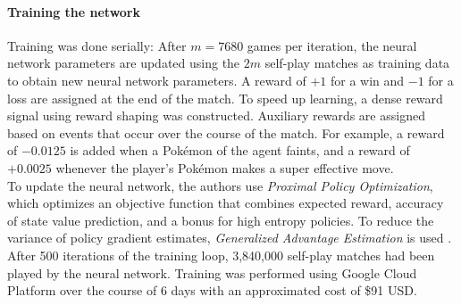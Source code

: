 \paragraph{Training the network}
Training was done serially: After $m = 7680$ games per iteration, the neural network parameters are updated
using the $2m$ self-play matches as training data to obtain new neural network parameters. A reward
of $+1$ for a win and $-1$ for a loss are assigned at the end of the match. To speed up learning, a 
dense reward signal using reward shaping was constructed. Auxiliary rewards are assigned based on
events that occur over the course of the match. For example, a reward of $-0.0125$ is added when a 
Pokémon of the agent faints, and a reward of $+0.0025$ whenever the player's Pokémon makes a 
super effective move. \\
To update the neural network, the authors use \textit{Proximal Policy Optimization}, which optimizes
an objective function that combines expected reward, accuracy of state value prediction, and a bonus
for high entropy policies. To reduce the variance of policy gradient estimates, \textit{Generalized
Advantage Estimation} is used . \\
After 500 iterations of the training loop, 3,840,000 self-play matches had been played by the neural
network. Training was performed using Google Cloud Platform over the course of 6 days with an 
approximated cost of \$91 USD.
